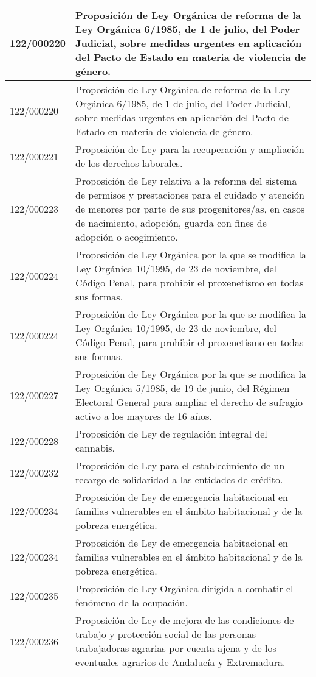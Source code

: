 {\begin{table}[H]
\begin{center}
\begin{tabularx}{\linewidth}{| l | X |}
\hline
122/000220 & Proposición de Ley Orgánica de reforma de la Ley Orgánica 6/1985, de 1 de julio, del Poder Judicial, sobre medidas urgentes en aplicación del Pacto de Estado en materia de violencia de género. \\
\hline
122/000220 & Proposición de Ley Orgánica de reforma de la Ley Orgánica 6/1985, de 1 de julio, del Poder Judicial, sobre medidas urgentes en aplicación del Pacto de Estado en materia de violencia de género. \\
\hline
122/000221 & Proposición de Ley para la recuperación y ampliación de los derechos laborales. \\
\hline
122/000223 & Proposición de Ley relativa a la reforma del sistema de permisos y prestaciones para el cuidado y atención de menores por parte de sus progenitores/as, en casos de nacimiento, adopción, guarda con fines de adopción o acogimiento. \\
\hline
122/000224 & Proposición de Ley Orgánica por la que se modifica la Ley Orgánica 10/1995, de 23 de noviembre, del Código Penal, para prohibir el proxenetismo en todas sus formas. \\
\hline
122/000224 & Proposición de Ley Orgánica por la que se modifica la Ley Orgánica 10/1995, de 23 de noviembre, del Código Penal, para prohibir el proxenetismo en todas sus formas. \\
\hline
122/000227 & Proposición de Ley Orgánica por la que se modifica la Ley Orgánica 5/1985, de 19 de junio, del Régimen Electoral General para ampliar el derecho de sufragio activo a los mayores de 16 años. \\
\hline
122/000228 & Proposición de Ley de regulación integral del cannabis. \\
\hline
122/000232 & Proposición de Ley para el establecimiento de un recargo de solidaridad a las entidades de crédito. \\
\hline
122/000234 & Proposición de Ley de emergencia habitacional en familias vulnerables en el ámbito habitacional y de la pobreza energética. \\
\hline
122/000234 & Proposición de Ley de emergencia habitacional en familias vulnerables en el ámbito habitacional y de la pobreza energética. \\
\hline
122/000235 & Proposición de Ley Orgánica dirigida a combatir el fenómeno de la ocupación. \\
\hline
122/000236 & Proposición de Ley de mejora de las condiciones de trabajo y protección social de las personas trabajadoras agrarias por cuenta ajena y de los eventuales agrarios de Andalucía y Extremadura. \\

\end{tabularx}
\end{center}
\end{table}}
